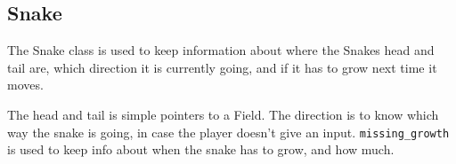 \subsection{Snake}

The Snake class is used to keep information about where the Snakes head and tail are, which direction it is currently going, and if it has to grow next time it moves.

The head and tail is simple pointers to a Field. The direction is to know which way the snake is going, in case the player doesn't give an input. \texttt{missing\_growth} is used to keep info about when the snake has to grow, and how much.
